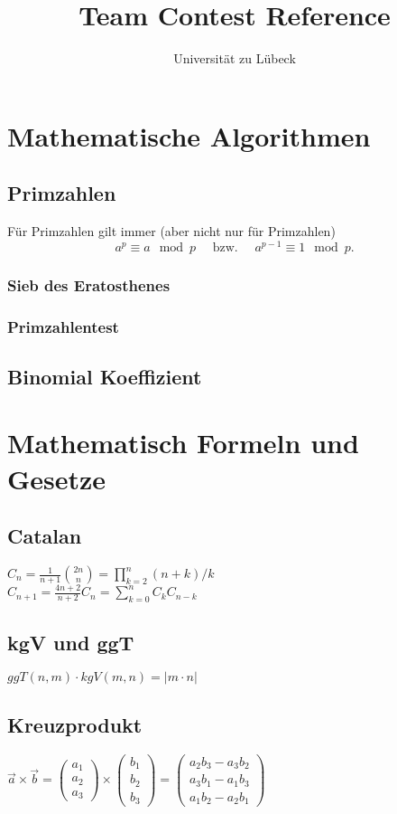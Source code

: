 \documentclass[10pt,a4paper,ngerman,oneside,twocolumn]{article}
\title{Team Contest Reference}
\author{Universität zu Lübeck}
\begin{document}
\lstset{basicstyle=\ttfamily\footnotesize,numbers=left,numberstyle=\tiny,tabsize=2,numbersep=5pt}
\maketitle
\thispagestyle{fancy}

\section{Mathematische Algorithmen}
\subsection{Primzahlen}
Für Primzahlen gilt immer (aber nicht nur für Primzahlen)
\[a^p\equiv a\mod p \quad\text{ bzw. }\quad a^{p-1}\equiv 1 \mod p.\]
\subsubsection{Sieb des Eratosthenes}

\subsubsection{Primzahlentest}

\subsection{Binomial Koeffizient}


\section{Mathematisch Formeln und Gesetze}
\subsection{Catalan}
$C_n = \frac1{n+1}\binom{2n}{n}=\prod_{k=2}^n (n+k)/k$\\
$C_{n+1} = \frac{4n+2}{n+2}C_n=\sum_{k=0}^{n}C_kC_{n-k}$
\subsection{kgV und ggT}
$ggT(n,m)\cdot kgV(m,n)=|m\cdot n|$
\subsection{Kreuzprodukt}
$\vec{a}\times\vec{b}
  =
  \begin{pmatrix}a_1 \\ a_2 \\ a_3\end{pmatrix}
  \times
  \begin{pmatrix}b_1 \\ b_2 \\ b_3 \end{pmatrix}
  =
  \begin{pmatrix}
    a_2b_3 - a_3b_2 \\
    a_3b_1 - a_1b_3 \\
    a_1b_2 - a_2b_1
  \end{pmatrix}$
\end{document}
